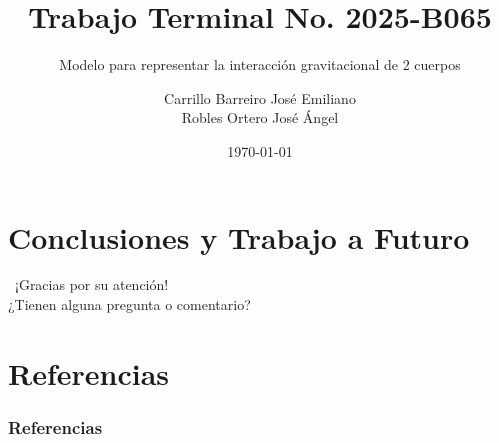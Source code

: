 \documentclass[spanish]{beamer}
\author[Carrillo B. José E. \&  Robles O. José A.]{Carrillo Barreiro José Emiliano \\ Robles Ortero José Ángel}
\title{Trabajo Terminal No. 2025-B065}
\subtitle{Modelo para representar la interacción gravitacional de $2$ cuerpos}
\institute{
    Instituto Politécnico Nacional \\
    Escuela Superior de Cómputo
    }
\date{\today}
\begin{document}
    \begin{frame}
        \titlepage%
    \end{frame}

    
    
    
    
    
    

    \section[Conclusiones]{Conclusiones y Trabajo a Futuro}

    \begin{frame}
        \begin{center}
            {\Huge\calligra~¡Gracias por su atención!}\\
            ¿Tienen alguna pregunta o comentario?
        \end{center}
    \end{frame}

    \section*{Referencias}

    \begin{frame}[allowframebreaks]
        \frametitle{Referencias}
        \begingroup
        \fontsize{6pt}{7pt}\selectfont
        \printbibliography[heading=none]
        \endgroup
    \end{frame}
\end{document}
